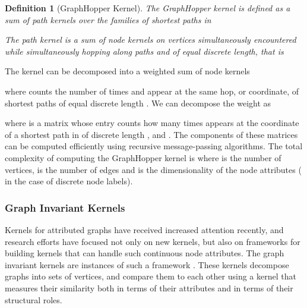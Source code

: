\documentclass[twoside,11pt]{article}
\newtheorem{definition}{Definition}
\begin{document}
\begin{definition}[GraphHopper Kernel]
  The GraphHopper kernel is defined as a sum of path kernels  over the families  of shortest
  paths in 
  
  The path kernel  is a sum of node kernels  on vertices simultaneously encountered while simultaneously hopping along paths  and  of equal discrete length, that is
  
\end{definition}

The  kernel can be decomposed into a weighted sum of node kernels

where  counts the number of times  and  appear at the same hop, or coordinate,  of shortest paths  of equal discrete length .
We can decompose the weight  as

where  is a  matrix whose entry  counts how many times  appears at the  coordinate of a shortest path in  of discrete length , and .
The components of these matrices can be computed efficiently using recursive message-passing algorithms. 
The total complexity of computing the GraphHopper kernel is  where  is the number of vertices,  is the number of edges and  is the dimensionality of the node attributes ( in the case of discrete node labels).


\subsubsection{Graph Invariant Kernels}
Kernels for attributed graphs have received increased attention recently, and research efforts have focused not only on new kernels, but also on frameworks for building kernels that can handle such continuous node attributes.
The graph invariant kernels are instances of such a framework \cite{orsini2015graph}.
These kernels decompose graphs into sets of vertices, and compare them to each other using a kernel that measures their similarity both in terms of their attributes and in terms of their structural roles.
\end{document}
